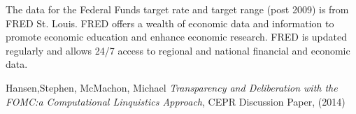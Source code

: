 \documentclass{article}
\begin{document}
The data for the Federal Funds target rate and target range (post 2009) is from FRED St. Louis.  FRED offers a wealth of economic data and information to promote economic education and enhance economic research. FRED is updated regularly and allows 24/7 access to regional and national financial and economic data.  \vspace{5mm}



\begin{thebibliography}{99}

 Hansen,Stephen, McMachon, Michael  \emph{Transparency and Deliberation with the FOMC:a Computational Linquistics Approach}, CEPR Discussion Paper, (2014)

\end{thebibliography}
\end{document}
